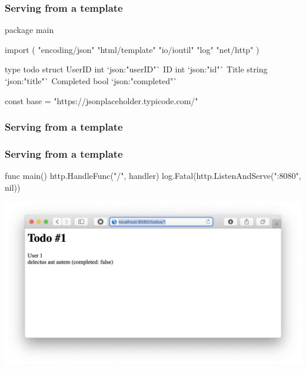 \documentclass[handout,compress,t,11pt]{beamer}
\begin{document}
\begin{frame}[fragile]
    \frametitle{Serving from a template}
\begin{golang}
package main

import (
	"encoding/json"
	"html/template"
	"io/ioutil"
	"log"
	"net/http"
)

type todo struct {
	UserID    int    `json:"userID"`
	ID        int    `json:"id"`
	Title     string `json:"title"`
	Completed bool   `json:"completed"`
}

const base = "https://jsonplaceholder.typicode.com/"
\end{golang}
\end{frame}

\begin{frame}[fragile]
    \frametitle{Serving from a template}
\end{frame}

\begin{frame}[fragile]
    \frametitle{Serving from a template}
\begin{golang}
func main() {
	http.HandleFunc("/", handler)
	log.Fatal(http.ListenAndServe(":8080", nil))
}
\end{golang}
\vspace{-0.4\baselineskip}
\begin{center}
    \includegraphics[width=.9\textwidth]{todos-1.png}
\end{center}
\end{frame}
\end{document}
